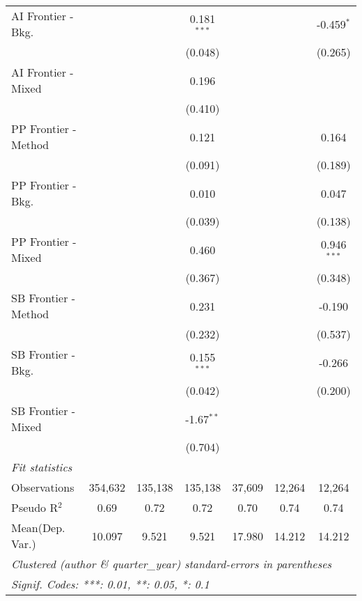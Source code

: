 \begin{tabular}{lcccccc}
   AI Frontier - Bkg.   &               &               & 0.181$^{***}$ &               &         & -0.459$^{*}$\\   
                        &               &               & (0.048)       &               &         & (0.265)\\   
   AI Frontier - Mixed  &               &               & 0.196         &               &         &   \\   
                        &               &               & (0.410)       &               &         &   \\   
   PP Frontier - Method &               &               & 0.121         &               &         & 0.164\\   
                        &               &               & (0.091)       &               &         & (0.189)\\   
   PP Frontier - Bkg.   &               &               & 0.010         &               &         & 0.047\\   
                        &               &               & (0.039)       &               &         & (0.138)\\   
   PP Frontier - Mixed  &               &               & 0.460         &               &         & 0.946$^{***}$\\   
                        &               &               & (0.367)       &               &         & (0.348)\\   
   SB Frontier - Method &               &               & 0.231         &               &         & -0.190\\   
                        &               &               & (0.232)       &               &         & (0.537)\\   
   SB Frontier - Bkg.   &               &               & 0.155$^{***}$ &               &         & -0.266\\   
                        &               &               & (0.042)       &               &         & (0.200)\\   
   SB Frontier - Mixed  &               &               & -1.67$^{**}$  &               &         &   \\   
                        &               &               & (0.704)       &               &         &   \\   
   \midrule
   \emph{Fit statistics}\\
   Observations         & 354,632       & 135,138       & 135,138       & 37,609        & 12,264  & 12,264\\  
   Pseudo R$^2$         & 0.69          & 0.72          & 0.72          & 0.70          & 0.74    & 0.74\\  
Mean(Dep. Var.) & 10.097 & 9.521 & 9.521 & 17.980 & 14.212 & 14.212 \\
   \midrule \midrule
   \multicolumn{7}{l}{\emph{Clustered (author \& quarter\_year) standard-errors in parentheses}}\\
   \multicolumn{7}{l}{\emph{Signif. Codes: ***: 0.01, **: 0.05, *: 0.1}}\\
\end{tabular}
\par\endgroup
